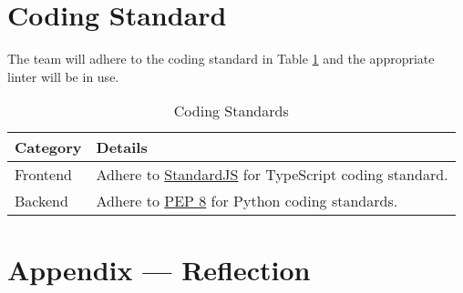 \documentclass{article}
\begin{document}
\section{Coding Standard}

The team will adhere to the coding standard in Table \ref{table:5} and the appropriate linter will be in use.
\begin{table}[htbp]
    \centering
    \begin{tabularx}{\textwidth}{|l|>{\raggedright\arraybackslash}X|}
    \hline
    \textbf{Category} & \textbf{Details} \\
    \hline
    Frontend & Adhere to \href{https://standardjs.com/}{StandardJS} for
    TypeScript coding standard. \\
    \hline
    Backend & Adhere to
    \href{https://www.python.org/dev/peps/pep-0008/}{PEP 8} for Python coding
    standards. \\
    \hline
    \end{tabularx}
    \caption{Coding Standards}
    \label{table:5}
\end{table}


\newpage{}

\section*{Appendix --- Reflection}
\end{document}
